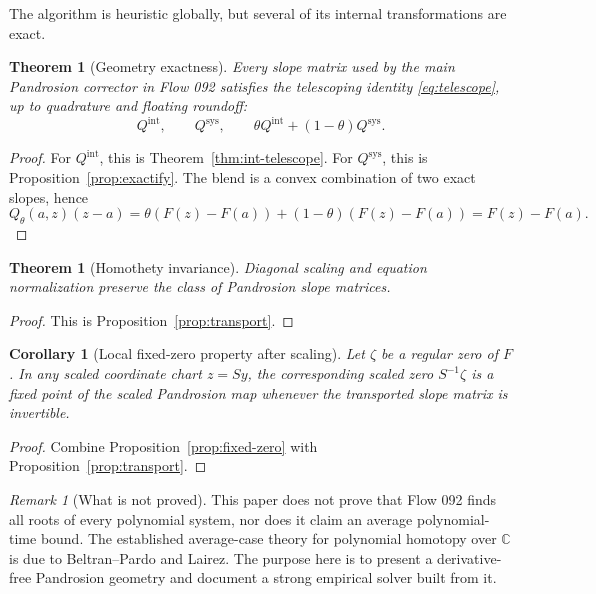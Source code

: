 \documentclass[11pt,a4paper]{article}
\theoremstyle{definition}
\theoremstyle{plain}
\newtheorem{theorem}[definition]{Theorem}
\newtheorem{corollary}[definition]{Corollary}
\theoremstyle{remark}
\newtheorem{remark}[definition]{Remark}
\newcommand{\C}{\mathbb C}
\begin{document}
The algorithm is heuristic globally, but several of its internal transformations
are exact.

\begin{theorem}[Geometry exactness]
Every slope matrix used by the main Pandrosion corrector in Flow 092 satisfies
the telescoping identity \eqref{eq:telescope}, up to quadrature and floating
roundoff:
\[
  Q^{\mathrm{int}},\qquad Q^{\mathrm{sys}},\qquad
  \theta Q^{\mathrm{int}}+(1-\theta)Q^{\mathrm{sys}}.
\]
\end{theorem}

\begin{proof}
For \(Q^{\mathrm{int}}\), this is Theorem~\ref{thm:int-telescope}.  For
\(Q^{\mathrm{sys}}\), this is Proposition~\ref{prop:exactify}.  The blend is a
convex combination of two exact slopes, hence
\[
  Q_\theta(a,z)(z-a)
  =
  \theta(F(z)-F(a))+(1-\theta)(F(z)-F(a))
  =
  F(z)-F(a).
\]
\end{proof}

\begin{theorem}[Homothety invariance]
Diagonal scaling and equation normalization preserve the class of Pandrosion
slope matrices.
\end{theorem}

\begin{proof}
This is Proposition~\ref{prop:transport}.
\end{proof}

\begin{corollary}[Local fixed-zero property after scaling]
Let \(\zeta\) be a regular zero of \(F\).  In any scaled coordinate chart
\(z=Sy\), the corresponding scaled zero \(S^{-1}\zeta\) is a fixed point of
the scaled Pandrosion map whenever the transported slope matrix is invertible.
\end{corollary}

\begin{proof}
Combine Proposition~\ref{prop:fixed-zero} with Proposition~\ref{prop:transport}.
\end{proof}

\begin{remark}[What is not proved]
This paper does not prove that Flow 092 finds all roots of every polynomial
system, nor does it claim an average polynomial-time bound.  The established
average-case theory for polynomial homotopy over \(\C\) is due to
Beltran--Pardo and Lairez.  The purpose here is to present a derivative-free
Pandrosion geometry and document a strong empirical solver built from it.
\end{remark}
\end{document}
